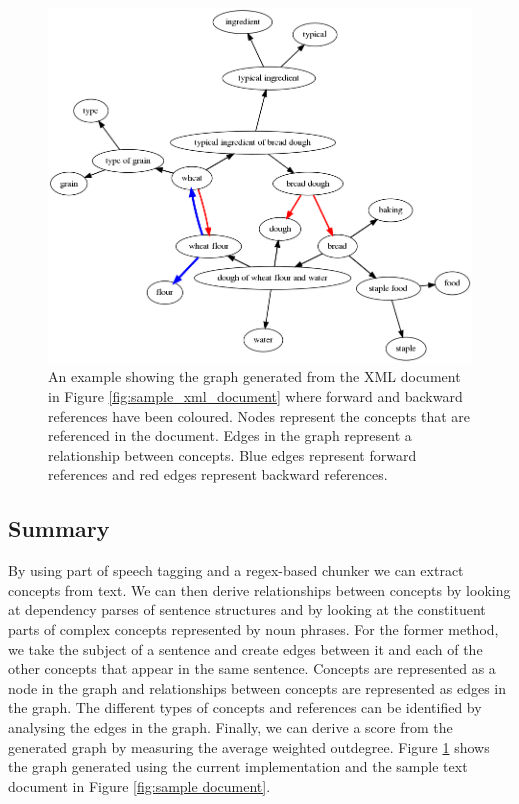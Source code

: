 \documentclass[12pt]{article}
\theoremstyle{grammarstyle}
\begin{document}
\begin{figure}
    \centering
    \includegraphics[width=\linewidth]{reports/technical_report/latex/figures/bread_graph-sections_only.png}
    \caption{An example showing the graph generated from the XML document in Figure \ref{fig:sample_xml_document} where forward and backward references have been coloured. Nodes represent the concepts that are referenced in the document. Edges in the graph represent a relationship between concepts. Blue edges represent forward references and red edges represent backward references.}
    \label{fig:graph_example-coloured_edges}
\end{figure}

\subsection{Summary}
By using part of speech tagging and a regex-based chunker we can extract concepts from text. We can then derive relationships between concepts by looking at dependency parses of sentence structures and by looking at the constituent parts of complex concepts represented by noun phrases. For the former method, we take the subject of a sentence and create edges between it and each of the other concepts that appear in the same sentence. Concepts are represented as a node in the graph and relationships between concepts are represented as edges in the graph.
The different types of concepts and references can be identified by analysing the edges in the graph. Finally, we can derive a score from the generated graph by measuring the average weighted outdegree. Figure \ref{fig:graph_example-coloured_edges} shows the graph generated using the current implementation and the sample text document in Figure \ref{fig:sample document}.
\end{document}
